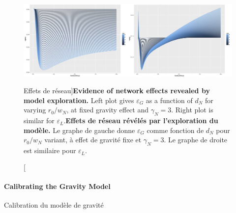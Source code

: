 \begin{figure}
\includegraphics[width=\linewidth]{Figures/Final/4-3-2-fig-interactiongibrat-networkeffects}
\caption[Evidence of network effects][Effets de réseau]{\textbf{Evidence of network effects revealed by model exploration.} Left plot gives $\varepsilon_G$ as a function of $d_N$ for varying $r_0/w_N$, at fixed gravity effect and $\gamma_N=3$. Right plot is similar for $\varepsilon_L$.\label{fig:interactiongibrat:networkeffects}}{\textbf{Effets de réseau révélés par l'exploration du modèle.} Le graphe de gauche donne $\varepsilon_G$ comme fonction de $d_N$ pour $r_0/w_N$ variant, à effet de gravité fixe et $\gamma_N=3$. Le graphe de droite est similaire pour $\varepsilon_L$.\label{fig:interactiongibrat:networkeffects}}
\end{figure}






\paragraph{Calibrating the Gravity Model}{Calibration du modèle de gravité}


